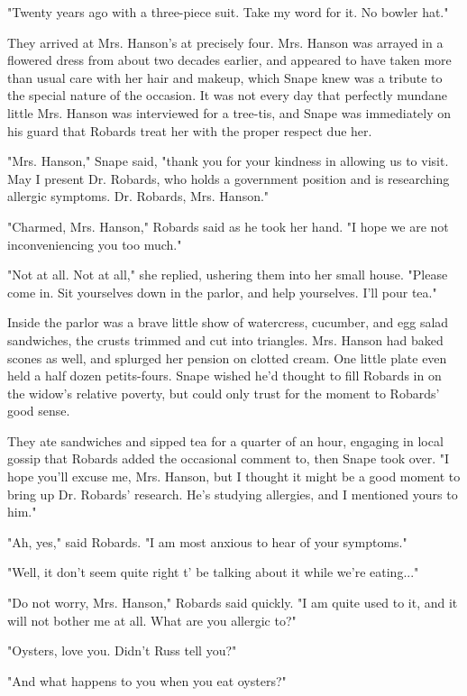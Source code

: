 "Twenty years ago with a three-piece suit. Take my word for it. No bowler hat."

They arrived at Mrs. Hanson's at precisely four. Mrs. Hanson was arrayed in a flowered dress from about two decades earlier, and appeared to have taken more than usual care with her hair and makeup, which Snape knew was a tribute to the special nature of the occasion. It was not every day that perfectly mundane little Mrs. Hanson was interviewed for a tree-tis, and Snape was immediately on his guard that Robards treat her with the proper respect due her.

"Mrs. Hanson," Snape said, "thank you for your kindness in allowing us to visit. May I present Dr. Robards, who holds a government position and is researching allergic symptoms. Dr. Robards, Mrs. Hanson."

"Charmed, Mrs. Hanson," Robards said as he took her hand. "I hope we are not inconveniencing you too much."

"Not at all. Not at all," she replied, ushering them into her small house. "Please come in. Sit yourselves down in the parlor, and help yourselves. I'll pour tea."

Inside the parlor was a brave little show of watercress, cucumber, and egg salad sandwiches, the crusts trimmed and cut into triangles. Mrs. Hanson had baked scones as well, and splurged her pension on clotted cream. One little plate even held a half dozen petits-fours. Snape wished he'd thought to fill Robards in on the widow's relative poverty, but could only trust for the moment to Robards' good sense.

They ate sandwiches and sipped tea for a quarter of an hour, engaging in local gossip that Robards added the occasional comment to, then Snape took over. "I hope you'll excuse me, Mrs. Hanson, but I thought it might be a good moment to bring up Dr. Robards' research. He's studying allergies, and I mentioned yours to him."

"Ah, yes," said Robards. "I am most anxious to hear of your symptoms."

"Well, it don't seem quite right t' be talking about it while we're eating..."

"Do not worry, Mrs. Hanson," Robards said quickly. "I am quite used to it, and it will not bother me at all. What are you allergic to?"

"Oysters, love you. Didn't Russ tell you?"

"And what happens to you when you eat oysters?"

